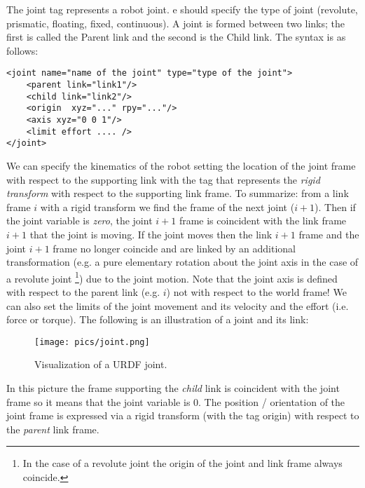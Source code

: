 \documentclass[11pt]{article}
\begin{document}
The joint tag represents a robot joint. e should specify the type of joint (revolute, prismatic, floating, fixed, continuous).  
A  joint is formed between two links; the first is called the Parent link
and the second is the Child link. The syntax is as follows:

\begin{Verbatim}	
<joint name="name of the joint" type="type of the joint">
	<parent link="link1"/>
	<child link="link2"/>
	<origin  xyz="..." rpy="..."/>
	<axis xyz="0 0 1"/>
	<limit effort .... />
</joint>
\end{Verbatim}

We can specify the kinematics of the robot setting the location of the joint frame with respect to the supporting link with the tag  that represents the \textit{rigid transform} with respect to the supporting link frame. To summarize: from a link frame $i$ with a rigid transform we find the frame of the next joint ($i+1$). Then if the joint variable  is \textit{zero}, the joint $i+1$ frame is coincident with the link frame $i+1$ that the joint is moving. If the joint moves  then the link $i+1$ frame and the joint $i+1$ frame no longer coincide and are linked by an additional transformation (e.g. a pure elementary rotation about the joint axis in the  case of a revolute joint \footnote{In the case of a revolute joint the origin of the joint and link frame always coincide.}) due to the joint motion. Note that the joint axis is defined with respect to the parent link (e.g. $i$) not with respect to the world frame!
We can also set the limits of the joint movement and
its velocity and the effort (i.e. force or torque).
 The following is an illustration of a joint and
its link:

\begin{figure}[H]
	\centering
	\texttt{[image: pics/joint.png]}
	\caption{Visualization of a URDF joint.}
	\label{fig:link}
\end{figure}

In this picture the frame supporting the \textit{child} link is coincident with the joint frame so it means that the joint variable is 0.
The position / orientation of the joint frame is expressed via a rigid transform (with the tag origin) with  respect to the \textit{parent} link frame. 
\\
\end{document}
